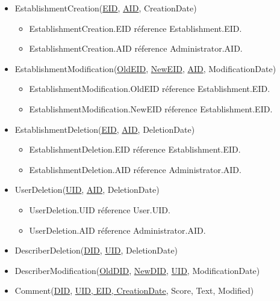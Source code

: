 \documentclass{article}
\begin{document}
\begin{itemize}
    \item EstablishmentCreation(\underline{EID}, \underline{AID}, CreationDate)
    
    \begin{itemize}
        \item EstablishmentCreation.EID réference Establishment.EID.
        \item EstablishmentCreation.AID réference Administrator.AID.
    \end{itemize}
    
    \item EstablishmentModification(\underline{OldEID}, \underline{NewEID}, \underline{AID}, ModificationDate)

    \begin{itemize}
        \item EstablishmentModification.OldEID réference Establishment.EID.
        \item EstablishmentModification.NewEID réference Establishment.EID.
    \end{itemize}
    
    \item EstablishmentDeletion(\underline{EID}, \underline{AID}, DeletionDate)

    \begin{itemize}
        \item EstablishmentDeletion.EID réference Establishment.EID.
        \item EstablishmentDeletion.AID réference Administrator.AID.
    \end{itemize}
    
    \item UserDeletion(\underline{UID}, \underline{AID}, DeletionDate)
    
    \begin{itemize}
        \item UserDeletion.UID réference User.UID.
        \item UserDeletion.AID réference Administrator.AID.
    \end{itemize}

    
    \item DescriberDeletion(\underline{DID}, \underline{UID}, DeletionDate)

    \item DescriberModification(\underline{OldDID}, \underline{NewDID}, \underline{UID}, ModificationDate)
    
    \item Comment(\underline{DID}, \underline{UID, EID, CreationDate}, Score, Text, Modified) 


\end{itemize}
\end{document}
